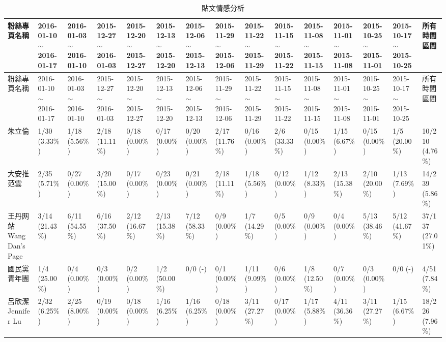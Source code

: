 \documentclass[letterpaper, 10pt, conference]{ieeeconf}   %
\begin{document}
\begin{CJK}{UTF8}{bsmi}
\begin{landscape}
\begin{longtable}[c]{@{}L{2.45cm}L{1.1cm}L{1.1cm}L{1.1cm}L{1.1cm}L{1.1cm}L{1.1cm}L{1.1cm}L{1.1cm}L{1.1cm}L{1.1cm}L{1.1cm}L{1.1cm}L{1.1cm}L{1.1cm}@{}}
\caption{貼文情感分析}
\label{t5}\\
\toprule
粉絲專頁名稱 & 2016-01-10 $\sim$ 2016-01-17 & 2016-01-03 $\sim$ 2016-01-10 & 2015-12-27 $\sim$ 2016-01-03 & 2015-12-20 $\sim$ 2015-12-27 & 2015-12-13 $\sim$ 2015-12-20 & 2015-12-06 $\sim$ 2015-12-13 & 2015-11-29 $\sim$ 2015-12-06 & 2015-11-22 $\sim$ 2015-11-29 & 2015-11-15 $\sim$ 2015-11-22 & 2015-11-08 $\sim$ 2015-11-15 & 2015-11-01 $\sim$ 2015-11-08 & 2015-10-25 $\sim$ 2015-11-01 & 2015-10-17 $\sim$ 2015-10-25 & 所有時間區間 \\* \midrule
\endfirsthead
\toprule
粉絲專頁名稱 & 2016-01-10 $\sim$ 2016-01-17 & 2016-01-03 $\sim$ 2016-01-10 & 2015-12-27 $\sim$ 2016-01-03 & 2015-12-20 $\sim$ 2015-12-27 & 2015-12-13 $\sim$ 2015-12-20 & 2015-12-06 $\sim$ 2015-12-13 & 2015-11-29 $\sim$ 2015-12-06 & 2015-11-22 $\sim$ 2015-11-29 & 2015-11-15 $\sim$ 2015-11-22 & 2015-11-08 $\sim$ 2015-11-15 & 2015-11-01 $\sim$ 2015-11-08 & 2015-10-25 $\sim$ 2015-11-01 & 2015-10-17 $\sim$ 2015-10-25 & 所有時間區間 \\* \midrule
\endhead
%
\bottomrule
\endfoot
%
\endlastfoot
%
朱立倫 & 1/30 (3.33\%) & 1/18 (5.56\%) & 2/18 (11.11\%) & 0/18 (0.00\%) & 0/17 (0.00\%) & 0/20 (0.00\%) & 2/17 (11.76\%) & 0/16 (0.00\%) & 2/6 (33.33\%) & 0/15 (0.00\%) & 1/15 (6.67\%) & 0/15 (0.00\%) & 1/5 (20.00\%) & 10/210 (4.76\%) \\
大安推范雲 & 2/35 (5.71\%) & 0/27 (0.00\%) & 3/20 (15.00\%) & 0/17 (0.00\%) & 0/23 (0.00\%) & 0/21 (0.00\%) & 2/18 (11.11\%) & 1/18 (5.56\%) & 0/12 (0.00\%) & 1/12 (8.33\%) & 2/13 (15.38\%) & 2/10 (20.00\%) & 1/13 (7.69\%) & 14/239 (5.86\%) \\
王丹网站 Wang Dan's Page & 3/14 (21.43\%) & 6/11 (54.55\%) & 6/16 (37.50\%) & 2/12 (16.67\%) & 2/13 (15.38\%) & 7/12 (58.33\%) & 0/9 (0.00\%) & 1/7 (14.29\%) & 0/5 (0.00\%) & 0/9 (0.00\%) & 0/4 (0.00\%) & 5/13 (38.46\%) & 5/12 (41.67\%) & 37/137 (27.01\%) \\
國民黨青年團 & 1/4 (25.00\%) & 0/4 (0.00\%) & 0/3 (0.00\%) & 0/2 (0.00\%) & 1/2 (50.00\%) & 0/0 (-) & 0/1 (0.00\%) & 1/11 (9.09\%) & 0/6 (0.00\%) & 1/8 (12.50\%) & 0/7 (0.00\%) & 0/3 (0.00\%) & 0/0 (-) & 4/51 (7.84\%) \\
呂欣潔 Jennifer Lu & 2/32 (6.25\%) & 2/25 (8.00\%) & 0/19 (0.00\%) & 0/18 (0.00\%) & 1/16 (6.25\%) & 1/16 (6.25\%) & 0/18 (0.00\%) & 3/11 (27.27\%) & 0/17 (0.00\%) & 1/17 (5.88\%) & 4/11 (36.36\%) & 3/11 (27.27\%) & 1/15 (6.67\%) & 18/226 (7.96\%) \\

\end{longtable}
\end{landscape}
\end{CJK}
\end{document}
